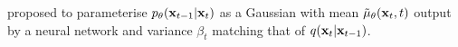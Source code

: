 
\citet{ho2020denoising} proposed to parameterise $p_\theta({\mathbf{x}}_{t-1}|{\mathbf{x}}_t)$ as a Gaussian with mean $\tilde{\mathbf{\mu}}_\theta({\mathbf{x}}_t, t)$ output by a neural network and variance $\beta_t$ matching that of $q({\mathbf{x}}_t|{\mathbf{x}}_{t-1})$.

